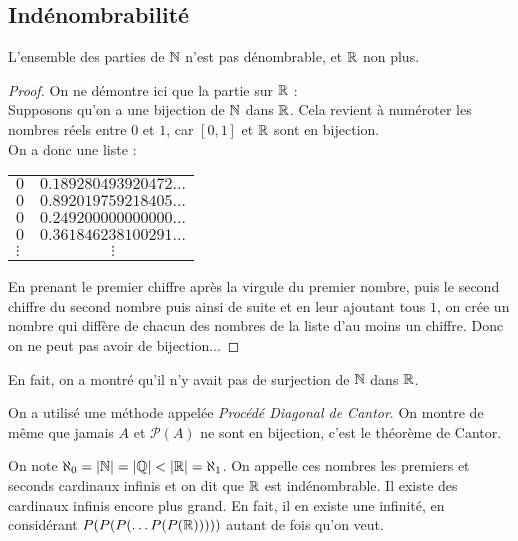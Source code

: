 \documentclass{cours}
\begin{document}
    \subsection{Indénombrabilité}
    \begin{theorem}
        L'ensemble des parties de $\mathbb{N}$ n'est pas dénombrable, et $\mathbb{R}$ non plus.
    \end{theorem}
    \begin{proof}
        On ne démontre ici que la partie sur $\mathbb{R}$ : \\
        Supposons qu'on a une bijection de $\mathbb{N}$ dans $\mathbb{R}$. Cela revient à numéroter les nombres réels entre $0$ et $1$, car $\left[0, 1\right]$ et $\mathbb{R}$ sont en bijection.\\
        On a donc une liste :
        \begin{center}
            \begin{tabular}{lc}
                $0$ & $0.189280493920472\ldots$\\
                $0$ & $0.892019759218405\ldots$\\
                $0$ & $0.249200000000000\ldots$\\
                $0$ & $0.361846238100291\ldots$\\
                $\vdots$ & $\vdots$
            \end{tabular}
        \end{center}
        En prenant le premier chiffre après la virgule du premier nombre, puis le second chiffre du second nombre puis ainsi de suite et en leur ajoutant tous $1$, on crée un nombre qui diffère de chacun des nombres de la liste d'au moins un chiffre. Donc on ne peut pas avoir de bijection... 
    \end{proof}

    \begin{remark}
        En fait, on a montré qu'il n'y avait pas de surjection de $\mathbb{N}$ dans $\mathbb{R}$.
    \end{remark}
    
    \begin{remark}
        On a utilisé une méthode appelée \emph{Procédé Diagonal de Cantor}. On montre de même que jamais $A$ et $\mathcal{P}(A)$ ne sont en bijection, c'est le théorème de Cantor.
    \end{remark}

    \begin{definition}
        On note $\aleph_{0} = \left|\mathbb{N}\right| = \left|\mathbb{Q}\right| < \left|\mathbb{R}\right| = \aleph_{1}$. On appelle ces nombres les premiers et seconds cardinaux infinis et on dit que $\mathbb{R}$ est indénombrable. Il existe des cardinaux infinis encore plus grand. En fait, il en existe une infinité, en considérant $P(P(P(\ldots P(P(\mathbb{R})))))$ autant de fois qu'on veut.
    \end{definition}
\end{document}
